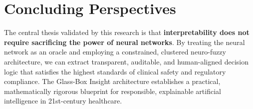 \documentclass{report}
\begin{document}
\section{Concluding Perspectives}

The central thesis validated by this research is that \textbf{interpretability does not require sacrificing the power of neural networks}. By treating the neural network as an oracle and employing a constrained, clustered neuro-fuzzy architecture, we can extract transparent, auditable, and human-aligned decision logic that satisfies the highest standards of clinical safety and regulatory compliance. The Glass-Box Insight architecture establishes a practical, mathematically rigorous blueprint for responsible, explainable artificial intelligence in 21st-century healthcare.


\clearpage
\linespread{1.0}\selectfont
\small
\setlength{\itemsep}{1.5pt plus 0.5pt}
\setlength{\parskip}{0pt}
\end{document}
